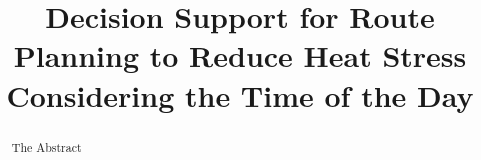 \documentclass[a4paper]{scrartcl}
\title{Decision Support for Route Planning to Reduce Heat Stress Considering
the Time of the Day}
\author{}
\begin{document}
\maketitle

\begin{abstract}
	The Abstract
\end{abstract}



\printbibliography
\end{document}

